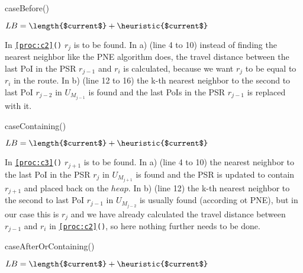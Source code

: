 \raggedbottom

\begin{procedure}[H]
\caption{caseBefore()}
\label{proc:c1}
	
	$LB = \length{$current$} + \heuristic{$current$}$\;
\end{procedure}

In \texttt{\ref{proc:c2}()} $r_j$ is to be found. In a) (line 4 to 10) instead of finding the nearest neighbor like the PNE algorithm does, the travel distance between the last PoI in the PSR $r_{j-1}$ and $r_i$ is calculated, because we want $r_j$ to be equal to $r_i$ in the route. In b) (line 12 to 16) the k-th nearest neighbor to the second to last PoI $r_{j-2}$ in $U_{M_{j-1}}$ is found and the last PoIs in the PSR $r_{j-1}$ is replaced with it.

\begin{procedure}[H]
\caption{caseContaining()}
\label{proc:c2}
	
	
	$LB = \length{$current$} + \heuristic{$current$}$\;
\end{procedure}

\flushbottom

In \texttt{\ref{proc:c3}()} $r_{j+1}$ is to be found. In a) (line 4 to 10) the nearest neighbor to the last PoI in the PSR $r_j$ in $U_{M_{j+1}}$ is found and the PSR is updated to contain $r_{j+1}$ and placed back on the $heap$. In b) (line 12) the k-th nearest neighbor to the second to last PoI $r_{j-1}$ in $U_{M_{j-2}}$ is usually found (according ot PNE), but in our case this is $r_j$ and we have already calculated the travel distance between $r_{j-1}$ and $r_i$ in \texttt{\ref{proc:c2}()}, so here nothing further needs to be done.

\begin{procedure}[htb!]
\caption{caseAfterOrContaining()}
\label{proc:c3}
	
	
	$LB = \length{$current$} + \heuristic{$current$}$\;
\end{procedure}

